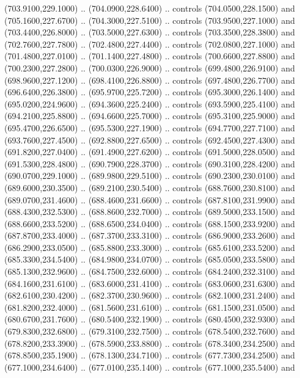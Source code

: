 {\begin{scope}[y=0.80pt, x=0.80pt, yscale=-1, xscale=1, inner sep=0pt, outer sep=0pt, #1]
      (703.9100,229.1000) .. (704.0900,228.6400) .. controls (704.0500,228.1500) and
      (705.1600,227.6700) .. (704.3000,227.5100) .. controls (703.9500,227.1000) and
      (703.4400,226.8000) .. (703.5000,227.6300) .. controls (703.3500,228.3800) and
      (702.7600,227.7800) .. (702.4800,227.4400) .. controls (702.0800,227.1000) and
      (701.4800,227.0100) .. (701.1400,227.4800) .. controls (700.6600,227.8800) and
      (700.2300,227.2800) .. (700.0300,226.9000) .. controls (699.4800,226.9100) and
      (698.9600,227.1200) .. (698.4100,226.8800) .. controls (697.4800,226.7700) and
      (696.6400,226.3800) .. (695.9700,225.7200) .. controls (695.3000,226.1400) and
      (695.0200,224.9600) .. (694.3600,225.2400) .. controls (693.5900,225.4100) and
      (694.2100,225.8800) .. (694.6600,225.7000) .. controls (695.3100,225.9000) and
      (695.4700,226.6500) .. (695.5300,227.1900) .. controls (694.7700,227.7100) and
      (693.7600,227.4500) .. (692.8800,227.6500) .. controls (692.4500,227.4300) and
      (691.8200,227.0400) .. (691.4900,227.6200) .. controls (691.5000,228.0500) and
      (691.5300,228.4800) .. (690.7900,228.3700) .. controls (690.3100,228.4200) and
      (690.0700,229.1000) .. (689.9800,229.5100) .. controls (690.2300,230.0100) and
      (689.6000,230.3500) .. (689.2100,230.5400) .. controls (688.7600,230.8100) and
      (689.0700,231.4600) .. (688.4600,231.6600) .. controls (687.8100,231.9900) and
      (688.4300,232.5300) .. (688.8600,232.7000) .. controls (689.5000,233.1500) and
      (688.6600,233.5200) .. (688.6500,234.0400) .. controls (688.1500,233.9200) and
      (687.8700,233.4000) .. (687.3700,233.3100) .. controls (686.9000,233.2600) and
      (686.2900,233.0500) .. (685.8800,233.3000) .. controls (685.6100,233.5200) and
      (685.3300,234.5400) .. (684.9800,234.0700) .. controls (685.0500,233.5800) and
      (685.1300,232.9600) .. (684.7500,232.6000) .. controls (684.2400,232.3100) and
      (684.1600,231.6100) .. (683.6000,231.4100) .. controls (683.0600,231.6300) and
      (682.6100,230.4200) .. (682.3700,230.9600) .. controls (682.1000,231.2400) and
      (681.8200,232.4000) .. (681.5600,231.6100) .. controls (681.1500,231.0500) and
      (680.6700,231.7600) .. (680.5400,232.1900) .. controls (680.4500,232.9300) and
      (679.8300,232.6800) .. (679.3100,232.7500) .. controls (678.5400,232.7600) and
      (678.8200,233.3900) .. (678.5900,233.8800) .. controls (678.3400,234.2500) and
      (678.8500,235.1900) .. (678.1300,234.7100) .. controls (677.7300,234.2500) and
      (677.1000,234.6400) .. (677.0100,235.1400) .. controls (677.1000,235.5400) and

\end{scope}}
